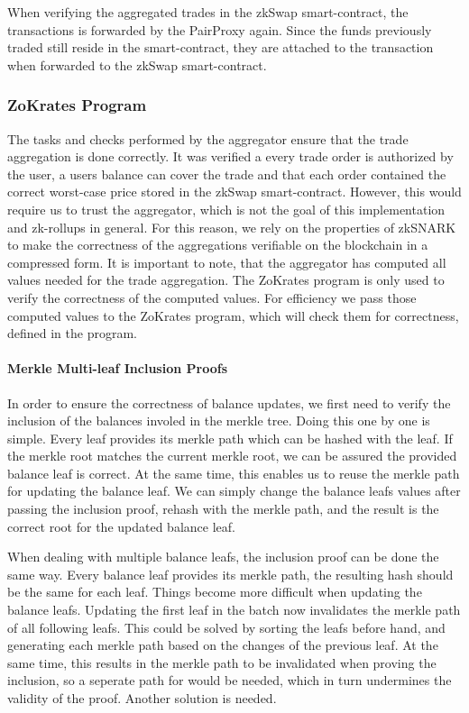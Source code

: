 \documentclass[../../thesis.tex]{subfiles}
\begin{document}
When verifying the aggregated trades in the zkSwap smart-contract, the transactions is forwarded by the PairProxy again. Since the funds previously traded still reside in the smart-contract, they are attached to the transaction when forwarded to the zkSwap smart-contract.


\subsubsection{ZoKrates Program} \label{zokrates}
The tasks and checks performed by the aggregator ensure that the trade aggregation is done correctly. It was verified a every trade order is authorized by the user, a users balance can cover the trade and that each order contained the correct worst-case price stored in the zkSwap smart-contract. However, this would require us to trust the aggregator, which is not the goal of this implementation and zk-rollups in general. For this reason, we rely on the properties of zkSNARK to make the correctness of the aggregations verifiable on the blockchain in a compressed form.  It is important to note, that the aggregator has computed all values needed for the trade aggregation. The ZoKrates program is only used to verify the correctness of the computed values. For efficiency we pass those computed values to the ZoKrates program, which will check them for correctness, defined in the program.

\paragraph{Merkle Multi-leaf Inclusion Proofs} 
In order to ensure the correctness of balance updates, we first need to verify the inclusion of the balances involed in the merkle tree. Doing this one by one is simple. Every leaf provides its merkle path which can be hashed with the leaf. If the merkle root matches the current merkle root, we can be assured the provided balance leaf is correct. At the same time, this enables us to reuse the merkle path for updating the balance leaf. We can simply change the balance leafs values after passing the inclusion proof, rehash with the merkle path, and the result is the correct root for the updated balance leaf. 

When dealing with multiple balance leafs, the inclusion proof can be done the same way. Every balance leaf provides its merkle path, the resulting hash should be the same for each leaf. Things become more difficult when updating the balance leafs. Updating the first leaf in the batch now invalidates the merkle path of all following leafs. This could be solved by sorting the leafs before hand, and generating each merkle path based on the changes of the previous leaf. At the same time, this results in the merkle path to be invalidated when proving the inclusion, so a seperate path for would be needed, which in turn undermines the validity of the proof. Another solution is needed. 
\end{document}
